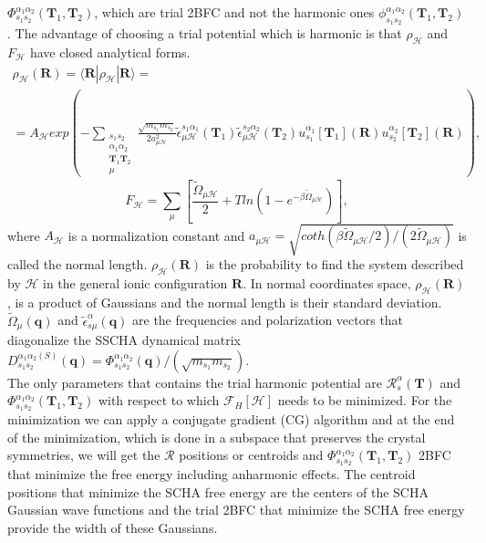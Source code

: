 $\Phi_{s_{1}s_{2}}^{\alpha_{1}\alpha_{2}}(\mathbf{T}_{1},\mathbf{T}_{2})$, which are trial 2BFC and not the harmonic ones $\phi_{s_{1}s_{2}}^{\alpha_{1}\alpha_{2}}(\mathbf{T}_{1},\mathbf{T}_{2})$. The advantage of choosing a 
trial potential which is harmonic is that $\rho_{\mathcal{H}}$ and $F_{\mathcal{H}}$ have closed analytical forms. 
\begin{multline}
 \rho_{\mathcal{H}}(\mathbf{R})=\langle\mathbf{R}|\rho_{\mathcal{H}}|\mathbf{R}\rangle=\\=A_{\mathcal{H}}exp\left(-\sum\limits_{\substack{s_{1}s_{2} \\ \alpha_{1}\alpha_{2} \\ \mathbf{T}_{1}\mathbf{T}_{2} \\ \mu}}\frac{\sqrt{
 m_{s_{1}}m_{s_{2}}}}{2a_{\mu\mathcal{H}}^{2}}\tilde{\epsilon}_{\mu\mathcal{H}}^{s_{1}\alpha_{1}}(\mathbf{T}_{1})\tilde{\epsilon}_{\mu\mathcal{H}}^{s_{2}\alpha_{2}}(\mathbf{T}_{2})u_{s_{1}}^{\alpha_{1}}[\mathbf{T}_{1}](\mathbf{
 R})u_{s_{2}}^{\alpha_{2}}[\mathbf{T}_{2}](\mathbf{R})\right),
\end{multline}
\begin{equation}
 F_{\mathcal{H}}=\sum_{\mu}\left[\frac{\tilde{\Omega}_{\mu\mathcal{H}}}{2}+Tln\left(1-e^{-\beta\tilde{\Omega}_{\mu\mathcal{H}}}\right)\right],
\end{equation}
where $A_{\mathcal{H}}$ is a normalization constant and $a_{\mu\mathcal{H}}=\sqrt{coth(\beta\tilde{\Omega}_{\mu\mathcal{H}}/2)/(2\tilde{\Omega}_{\mu\mathcal{H}})}$ is called the normal length. $\rho_{\mathcal{H}}(\mathbf{R})$ 
is the probability to find the system described by $\mathcal{H}$ in the general ionic configuration $\mathbf{R}$. In normal coordinates space, $\rho_{\mathcal{H}}(\mathbf{R})$, is a product of Gaussians and the normal length 
is their standard deviation. $\tilde{\Omega}_{\mu}(\mathbf{q})$ and $\tilde{\epsilon}_{s\mu}^{\alpha}(\mathbf{q})$ are the frequencies and polarization vectors that diagonalize the SSCHA dynamical 
matrix $D_{s_{1}s_{2}}^{\alpha_{1}\alpha_{2}(S)}(\mathbf{q})=\Phi_{s_{1}s_{2}}^{\alpha_{1}\alpha_{2}}(\mathbf{q})/(\sqrt{m_{s_{1}}m_{s_{2}}})$. \\

The only parameters that contains the trial harmonic potential are $\mathcal{R}_{s}^{\alpha}(\mathbf{T})$ and $\Phi_{s_{1}s_{2}}^{\alpha_{1}\alpha_{2}}(\mathbf{T}_{1},\mathbf{T}_{2})$ with respect to 
which $\mathcal{F}_{H}[\mathcal{H}]$ needs to be minimized. For the minimization we can apply a conjugate gradient (CG) algorithm and at the end of the minimization, which is done in a subspace that 
preserves the crystal symmetries, we will get the $\boldsymbol{\mathcal{R}}$ positions or centroids and $\Phi_{s_{1}s_{2}}^{\alpha_{1}\alpha_{2}}(\mathbf{T}_{1},\mathbf{T}_{2})$ 2BFC that minimize 
the free energy including anharmonic effects. The centroid positions that minimize the SCHA free energy are the centers of the SCHA Gaussian wave functions and the trial 2BFC that minimize the SCHA free 
energy provide the width of these Gaussians. \\

